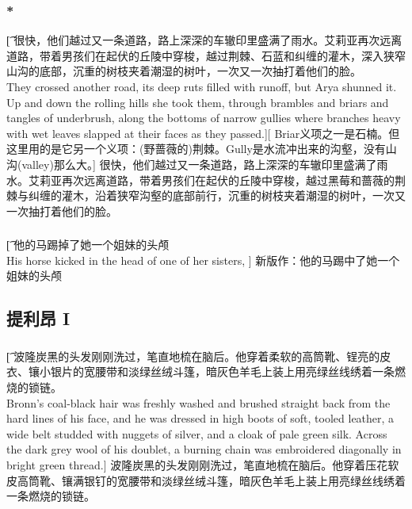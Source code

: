 \documentclass[12pt,a4paper]{article}
\begin{document}
\subsubsection{\color{red}*}\t[	
	很快，他们越过又一条道路，路上深深的车辙印里盛满了雨水。艾莉亚再次远离道路，带着男孩们在起伏的丘陵中穿梭，越过荆棘、石蓝和纠缠的灌木，深入狭窄山沟的底部，沉重的树枝夹着潮湿的树叶，一次又一次抽打着他们的脸。\\
	They crossed another road, its deep ruts filled with runoff, but Arya shunned it. Up and down the rolling hills she took them, through brambles and briars and tangles of underbrush, along the bottoms of narrow gullies where branches heavy with wet leaves slapped at their faces as they passed.][
	Briar义项之一是石楠。但这里用的是它另一个义项：(野蔷薇的)荆棘。Gully是水流冲出来的沟壑，没有山沟(valley)那么大。]
	很快，他们越过又一条道路，路上深深的车辙印里盛满了雨水。艾莉亚再次远离道路，带着男孩们在起伏的丘陵中穿梭，越过黑莓和蔷薇的荆棘与纠缠的灌木，沿着狭窄沟壑的底部前行，沉重的树枝夹着潮湿的树叶，一次又一次抽打着他们的脸。
	
	
\subsubsection{}\t[
	他的马踢掉了她一个姐妹的头颅\\
	His horse kicked in the head of one of her sisters, ]
	新版作：他的马踢中了她一个姐妹的头颅
	

\subsection{提利昂 I}

\subsubsection{}\t[
	波隆炭黑的头发刚刚洗过，笔直地梳在脑后。他穿着柔软的高筒靴、锃亮的皮衣、镶小银片的宽腰带和淡绿丝绒斗篷，暗灰色羊毛上装上用亮绿丝线绣着一条燃烧的锁链。\\
	Bronn's coal-black hair was freshly washed and brushed straight back from the hard lines of his face, and he was dressed in high boots of soft, tooled leather, a wide belt studded with nuggets of silver, and a cloak of pale green silk. Across the dark grey wool of his doublet, a burning chain was embroidered diagonally in bright green thread.]
	波隆炭黑的头发刚刚洗过，笔直地梳在脑后。他穿着压花软皮高筒靴、镶满银钉的宽腰带和淡绿丝绒斗篷，暗灰色羊毛上装上用亮绿丝线绣着一条燃烧的锁链。
	
\end{document}
